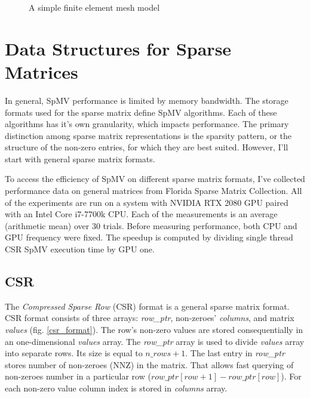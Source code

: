 \documentclass{article}
\begin{document}
\begin{figure}[H]
{
  }
  \caption{A simple finite element mesh model}
  \label{fem_to_sparse_matrix}
\end{figure}




\section{Data Structures for Sparse Matrices}
In general, SpMV performance is limited by memory bandwidth. The storage formats used for the sparse matrix define SpMV algorithms. Each of these
algorithms has it's own granularity, which impacts performance. The primary distinction among sparse matrix representations is the 
sparsity pattern, or the structure of the non-zero entries, for which they are best suited. However, I'll start with general sparse matrix formats. 

To access the efficiency of SpMV on different sparse matrix formats, I've collected performance data on general matrices from
Florida Sparse Matrix Collection. All of the experiments are run on a system with NVIDIA RTX 2080 GPU paired with an Intel Core i7-7700k CPU. Each
of the measurements is an average (arithmetic mean) over 30 trials. Before measuring performance, both CPU and GPU frequency were fixed. The speedup is computed
by dividing single thread CSR SpMV execution time by GPU one.




\subsection{CSR}
The \textit{Compressed Sparse Row} (CSR) format is a general sparse matrix format. CSR format consists of three arrays: \textit{row\_ptr},
non-zeroes' \textit{columns}, and matrix \textit{values} (fig. \ref{csr_format}). The row's non-zero values are stored consequentially in an one-dimensional \textit{values} array. The \textit{row\_ptr} array
is used to divide \textit{values} array into separate rows. Its size is equal to $n\_rows + 1$. The last entry in \textit{row\_ptr} stores number of non-zeroes (NNZ) in the
matrix. That allows fast querying of non-zeroes number in a particular row ($row\_ptr[row+1] - row\_ptr[row]$).
For each non-zero value column index is stored in \textit{columns} array.
\end{document}
